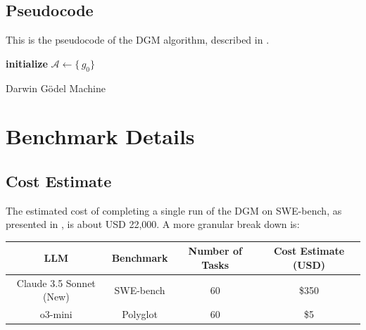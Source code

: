 \documentclass{article}
\begin{document}
\subsection{Pseudocode}
\label{app:pseudocode}

This is the pseudocode of the DGM algorithm, described in .

\begin{algorithm}[H]
\DontPrintSemicolon
\SetAlgoLined


\BlankLine
\textbf{initialize} $\mathcal{A} \leftarrow \{\,g_0\}$ 


\caption{Darwin Gödel Machine}
\label{alg:dgm}
\end{algorithm}

\section{Benchmark Details}

\subsection{Cost Estimate}
\label{app:cost-estimate}

The estimated cost of completing a single run of the DGM on SWE-bench, as presented in , is about USD 22,000. A more granular break down is:

\begin{table}[H]
\centering
\begin{tabular}{@{}cccc@{}}
\toprule
\textbf{LLM} & \textbf{Benchmark} & \textbf{Number of Tasks} & \textbf{Cost Estimate (USD)} \\ \midrule
Claude 3.5 Sonnet (New) & SWE-bench & 60 & \$350 \\
o3-mini & Polyglot & 60 & \$5 \\ \bottomrule
\end{tabular}
\end{table}
\end{document}

